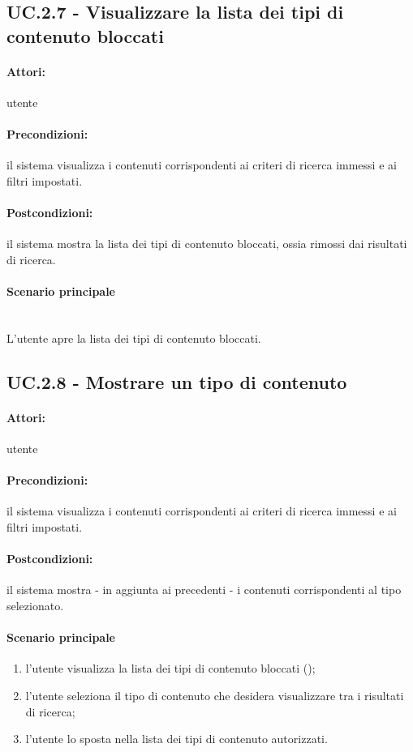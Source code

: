 \documentclass[10pt,a4paper,headinclude,footinclude,hidelinks]{scrreprt} %
\begin{document}
	\subsection[UC.2.7]{UC.2.7 - Visualizzare la lista dei tipi di contenuto bloccati}
	\label{ch:stage:ar:uc:2_7}
	\paragraph{Attori:} utente
	\paragraph{Precondizioni:} il sistema visualizza i contenuti corrispondenti ai criteri di ricerca immessi e ai filtri impostati.
	\paragraph{Postcondizioni:} il sistema mostra la lista dei tipi di contenuto bloccati, ossia rimossi dai risultati di ricerca.
	\paragraph{Scenario principale} \hfill \\
	L'utente apre la lista dei tipi di contenuto bloccati.

	\subsection[UC.2.8]{UC.2.8 - Mostrare un tipo di contenuto}
	\label{ch:stage:ar:uc:2_8}
	\paragraph{Attori:} utente
	\paragraph{Precondizioni:} il sistema visualizza i contenuti corrispondenti ai criteri di ricerca immessi e ai filtri impostati.
	\paragraph{Postcondizioni:} il sistema mostra - in aggiunta ai precedenti - i contenuti corrispondenti al tipo selezionato.
	\paragraph{Scenario principale}
	\begin{enumerate}
	\item l'utente visualizza la lista dei tipi di contenuto bloccati ();
	\item l'utente seleziona il tipo di contenuto che desidera visualizzare tra i risultati di ricerca;
	\item l'utente lo sposta nella lista dei tipi di contenuto autorizzati.
	\end{enumerate}
\end{document}
